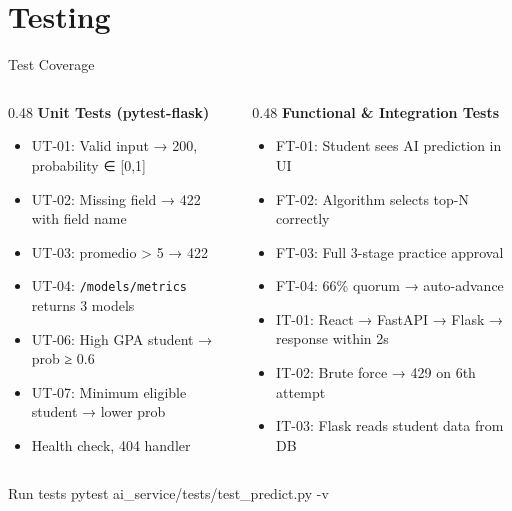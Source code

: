 \documentclass[aspectratio=169,12pt]{beamer}
\begin{document}
\section{Testing}

\begin{frame}{Test Coverage}
  \begin{columns}[T]
    \begin{column}{0.48\textwidth}
      \textbf{\color{vinotinto}Unit Tests (pytest-flask)}
      \begin{itemize}\footnotesize
        \item UT-01: Valid input → 200, probability ∈ [0,1]
        \item UT-02: Missing field → 422 with field name
        \item UT-03: promedio > 5 → 422
        \item UT-04: \texttt{/models/metrics} returns 3 models
        \item UT-06: High GPA student → prob ≥ 0.6
        \item UT-07: Minimum eligible student → lower prob
        \item Health check, 404 handler
      \end{itemize}
    \end{column}
    \begin{column}{0.48\textwidth}
      \textbf{\color{vinotinto}Functional \& Integration Tests}
      \begin{itemize}\footnotesize
        \item FT-01: Student sees AI prediction in UI
        \item FT-02: Algorithm selects top-N correctly
        \item FT-03: Full 3-stage practice approval
        \item FT-04: 66\% quorum → auto-advance
        \item IT-01: React → FastAPI → Flask → response within 2s
        \item IT-02: Brute force → 429 on 6th attempt
        \item IT-03: Flask reads student data from DB
      \end{itemize}
    \end{column}
  \end{columns}
  \vspace{0.3cm}
  \begin{block}{Run tests}
    \centering\footnotesize\ttfamily
    pytest ai\_service/tests/test\_predict.py -v
  \end{block}
\end{frame}
\end{document}
